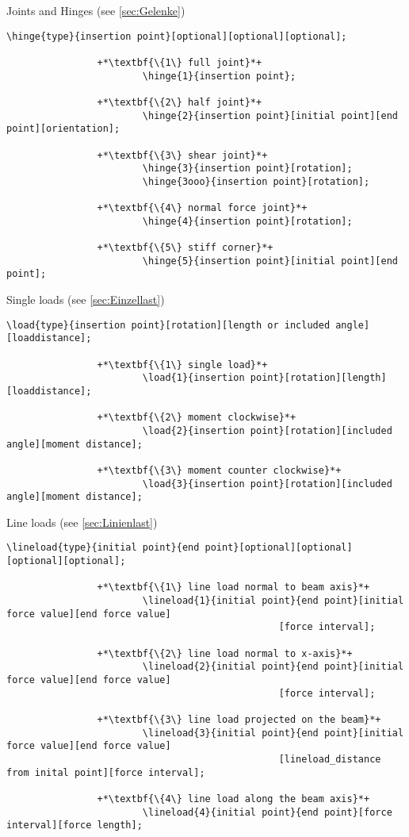 \documentclass[%
  a4paper,
  BCOR20mm,
  pointlessnumbers,
  twoside,
  halfparskip,
  openright,
]{scrreprt}
\begin{document}
Joints and Hinges (see \ref{sec:Gelenke})

\begin{lstlisting}[emph={hinge},backgroundcolor=\color{white}]
		\hinge{type}{insertion point}[optional][optional][optional];
		
				+*\textbf{\{1\} full joint}*+
						\hinge{1}{insertion point};
						
				+*\textbf{\{2\} half joint}*+
						\hinge{2}{insertion point}[initial point][end point][orientation];
						
				+*\textbf{\{3\} shear joint}*+
						\hinge{3}{insertion point}[rotation];
						\hinge{3ooo}{insertion point}[rotation];
						
				+*\textbf{\{4\} normal force joint}*+
						\hinge{4}{insertion point}[rotation];		

				+*\textbf{\{5\} stiff corner}*+
						\hinge{5}{insertion point}[initial point][end point];								
\end{lstlisting}\vspace{-10mm}

Single loads (see \ref{sec:Einzellast})

\begin{lstlisting}[emph={load},backgroundcolor=\color{white}]
		\load{type}{insertion point}[rotation][length or included angle][loaddistance];
		
				+*\textbf{\{1\} single load}*+
						\load{1}{insertion point}[rotation][length][loaddistance];
						
				+*\textbf{\{2\} moment clockwise}*+
						\load{2}{insertion point}[rotation][included angle][moment distance];
						
				+*\textbf{\{3\} moment counter clockwise}*+
						\load{3}{insertion point}[rotation][included angle][moment distance];				
\end{lstlisting}\vspace{-10mm}

Line loads (see \ref{sec:Linienlast})

\begin{lstlisting}[emph={lineload},backgroundcolor=\color{white}]
		\lineload{type}{initial point}{end point}[optional][optional][optional][optional];
		
				+*\textbf{\{1\} line load normal to beam axis}*+
						\lineload{1}{initial point}{end point}[initial force value][end force value]
												[force interval];
						
				+*\textbf{\{2\} line load normal to x-axis}*+
						\lineload{2}{initial point}{end point}[initial force value][end force value]
												[force interval];
						
				+*\textbf{\{3\} line load projected on the beam}*+
						\lineload{3}{initial point}{end point}[initial force value][end force value]
												[lineload_distance from inital point][force interval];	
						
				+*\textbf{\{4\} line load along the beam axis}*+
						\lineload{4}{initial point}{end point}[force interval][force length];				
\end{lstlisting}\vspace{-10mm}
\end{document}
